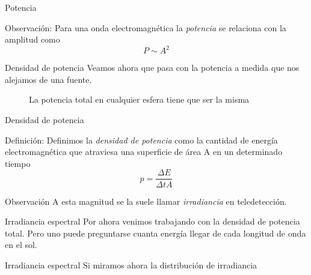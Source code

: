 \documentclass[handout,draft]{beamer}
\begin{document}
\begin{frame}{Potencia}
  \begin{block}{Observación:}
    Para una onda electromagnética la \emph{potencia} se relaciona con la amplitud como
    \begin{equation}
      P \sim A^2
    \end{equation}
  \end{block}
\end{frame}

\begin{frame}{Densidad de potencia}
  Veamos ahora que pasa con la potencia a medida que nos alejamos de una fuente.
  \begin{figure}
    \caption{La potencia total en cualquier esfera tiene que ser la misma}
  \end{figure}
\end{frame}

\begin{frame}{Densidad de potencia}
  \begin{block}{Definición:}
    Definimos la \emph{densidad de potencia} como la cantidad de energía electromagnética que atraviesa una superficie de área A en un determinado tiempo
    \begin{equation}
      p = \frac{\Delta E}{\Delta t A}
    \end{equation}
  \end{block}\pause
  \begin{block}{Observación}
    A esta magnitud se la suele llamar \emph{irradiancia} en teledetección.
  \end{block}
\end{frame}

\begin{frame}{Irradiancia espectral}
  Por ahora venimos trabajando con la densidad de potencia total. Pero uno puede preguntarse cuanta energía llegar de cada longitud de onda en el sol.
  \begin{figure}
  \end{figure}
\end{frame}

\begin{frame}{Irradiancia espectral}
  Si miramos ahora la distribución de irradiancia
  \begin{figure}
  \end{figure}
\end{frame}
\end{document}
